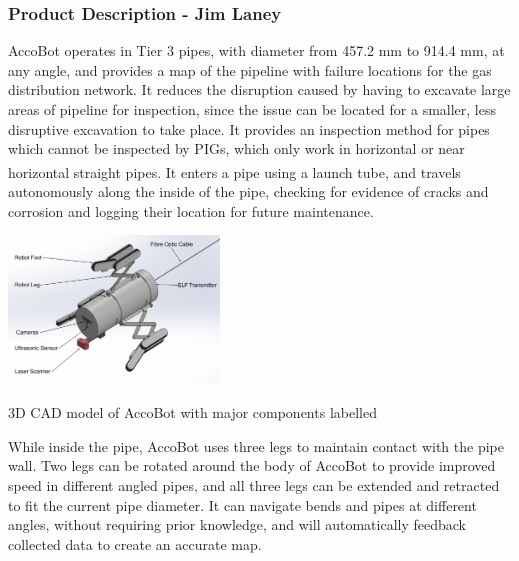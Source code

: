 \documentclass[11pt]{article}		%
\newcommand{\supercite}[1]{\textsuperscript{\cite{#1}}}		%
\begin{document}
	\subsubsection[Product Description]{Product Description - Jim Laney}
	        
			AccoBot operates in Tier 3 pipes, with diameter from 457.2 mm to 914.4 mm, at any angle, and provides a map of the pipeline with failure locations for the gas distribution network.
			It reduces the disruption caused by having to excavate large areas of pipeline for inspection, since the issue can be located for a smaller, less disruptive excavation to take place.
			It provides an inspection method for pipes which cannot be inspected by PIGs, which only work in horizontal or near horizontal straight pipes\supercite{mills2017advances}.
			It enters a pipe using a launch tube, and travels autonomously along the inside of the pipe, checking for evidence of cracks and corrosion and logging their location for future maintenance.
			\begin{floatingfigure}[r]{0.45\textwidth}
			    \centering
				\includegraphics[width = 0.42\textwidth]{overviewCADLabels}
				\caption{3D CAD model of AccoBot with major components labelled}
				\label{3DSketch}
			\end{floatingfigure}
			\hspace*{2ex} While inside the pipe, AccoBot uses three legs to maintain contact with the pipe wall.
			Two legs can be rotated around the body of AccoBot to provide improved speed in different angled pipes, and all three legs can be extended and retracted to fit the current pipe diameter.
			It can navigate bends and pipes at different angles, without requiring prior knowledge, and will automatically feedback collected data to create an accurate map.
			\begin{floatingfigure}[r]{0pt} \end{floatingfigure}
\end{document}
